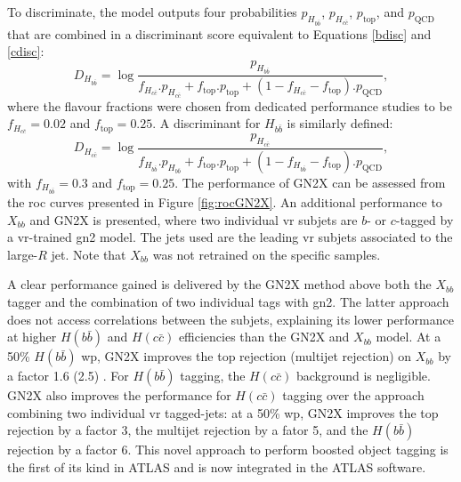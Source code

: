 To discriminate, the model outputs four probabilities $p_{H_{b\bar{b}}}$, $p_{H_{c\bar{c}}}$, $p_{\textrm{top}}$, and $p_{\textrm{QCD}}$ that are combined in a discriminant score equivalent to Equations \ref{bdisc} and \ref{cdisc}: 
\begin{equation}
  D_{H_{b\bar{b}}} = \log \frac{p_{H_{b\bar{b}}}}{f_{H_{c\bar{c}}} . p_{H_{c\bar{c}}} + f_{\textrm{top}} . p_{\textrm{top}} + (1 - f_{H_{c\bar{c}}} - f_{\textrm{top}}) . p_{\textrm{QCD}}},
\end{equation}
where the flavour fractions were chosen from dedicated performance studies to be $f_{H_{c\bar{c}}} = 0.02$ and $f_{\textrm{top}} = 0.25$. A discriminant for $H_{b\bar{b}}$ is similarly defined:
\begin{equation}
  D_{H_{c\bar{c}}} = \log \frac{p_{H_{c\bar{c}}}}{f_{H_{b\bar{b}}} . p_{H_{b\bar{b}}} + f_{\textrm{top}} . p_{\textrm{top}} + (1 - f_{H_{b\bar{b}}} - f_{\textrm{top}}) . p_{\textrm{QCD}}},
\end{equation}
with $f_{H_{b\bar{b}}} = 0.3$ and $f_{\textrm{top}} = 0.25$. The performance of GN2X can be assessed from the \gls{roc} curves presented in Figure \ref{fig:rocGN2X}. An additional performance to $X_{bb}$ and GN2X is presented, where two individual \gls{vr} subjets are $b$- or $c$-tagged by a \gls{vr}-trained \gls{gn2} model. The jets used are the leading \gls{vr} subjets associated to the large-$R$ jet. Note that $X_{bb}$ was not retrained on the specific samples.


A clear performance gained is delivered by the GN2X method above both the $X_{bb}$ tagger and the combination of two individual tags with \gls{gn2}. The latter approach does not access correlations between the subjets, explaining its lower performance at higher $H(b\bar{b})$ and $H(c\bar{c})$ efficiencies than the GN2X and $X_{bb}$ model. At a 50\% $H(b\bar{b})$ \gls{wp}, GN2X improves the top rejection (multijet rejection) on $X_{bb}$ by a factor 1.6 (2.5) \cite{ATL-PHYS-PUB-2023-021}. For $H(b\bar{b})$ tagging, the $H(c\bar{c})$ background is negligible. GN2X also improves the performance for $H(c\bar{c})$ tagging over the approach combining two individual \gls{vr} tagged-jets: at a 50\% \gls{wp}, GN2X improves the top rejection by a factor 3, the multijet rejection by a fator 5, and the $H(b\bar{b})$ rejection by a factor 6. This novel approach to perform boosted object tagging is the first of its kind in ATLAS and is now integrated in the ATLAS software.

